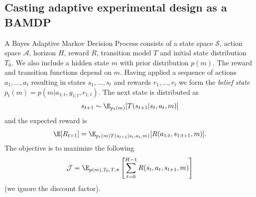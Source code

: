 \subsection{Casting adaptive experimental design as a BAMDP}
A Bayes Adaptive Markov Decision Process \cite{guez2015sample,zintgraf2019varibad} consists of a state space $\mathcal{S}$, action space $\mathcal{A}$, horizon $H$, reward $R$, transition model $T$ and initial state distribution $T_0$. We also include a hidden state $m$ with prior distribution $p(m)$. The reward and transition functions depend on $m$. Having applied a sequence of actions $a_1, ..., a_t$ resulting in states $s_1, ..., s_t$ and rewards $r_1, ..., r_t$ we form the \textit{belief state} $p_t(m) = p(m|a_{1:t},y_{1:t},r_{1:t})$. The next state is distributed as
\begin{equation}
	s_{t+1} \sim \E_{p_t(m)}[T(s_{t+1}|s_t,a_t,m)]
\end{equation}
and the expected reward is
\begin{equation}
	\E[R_{t+1}] = \E_{p_t(m)T(s_{t+1}|s_t,a_t,m)}[R(a_{1:t}, s_{1:t+1},m)].
\end{equation}
The objective is to maximize the following
\begin{equation}
	\mathcal{J} = \E_{p(m), T_0, T, \pi}\left[ \sum_{t=0}^{H-1} R(s_t,a_t,s_{t+1},m) \right]
\end{equation}
(we ignore the discount factor).

